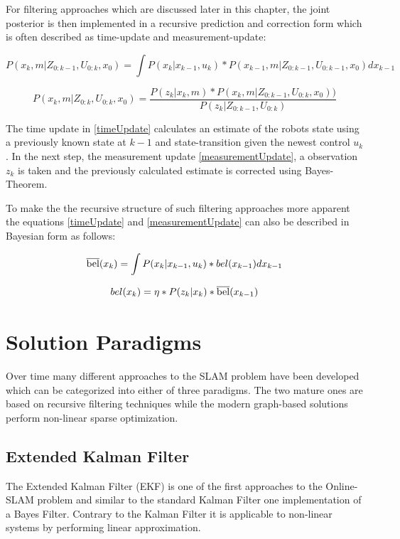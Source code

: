 For filtering approaches which are discussed later in this chapter, the joint posterior is then implemented in a recursive prediction and correction form which is often described as time-update and measurement-update:

\begin{equation}\label{timeUpdate}
	P(x_{k}, m | Z_{0:k-1}, U_{0:k}, x_{0}) = \int P(x_{k} | x_{k-1}, u_{k}) * P(x_{k-1}, m | Z_{0:k-1}, U_{0:k-1}, x_{0}) dx_{k-1}
\end{equation}


\begin{equation}\label{measurementUpdate}
	P(x_{k}, m | Z_{0:k}, U_{0:k}, x_{0}) = \frac{P(z_{k} | x_{k}, m) * P(x_{k}, m | Z_{0:k-1}, U_{0:k}, x_{0}))}{P(z_{k} | Z_{0:k-1}, U_{0:k})}
\end{equation}

The time update in \ref{timeUpdate} calculates an estimate of the robots state using a previously known state at $ k - 1 $ and state-transition given the newest control $ u_{k} $.
In the next step, the measurement update \ref{measurementUpdate}, a observation $z_{k} $ is taken and the previously calculated estimate is corrected using Bayes-Theorem. 

To make the the recursive structure of such filtering approaches more apparent the equations \ref{timeUpdate} and \ref{measurementUpdate} can also be described in Bayesian form as follows:

\begin{equation}\label{timeUpdateBayes}
	\overline{\rm bel}(x_{k}) = \int P(x_{k} | x_{k-1}, u_{k}) * bel(x_{k-1}) dx_{k-1}
\end{equation}


\begin{equation}\label{measurementUpdateBayes}
	bel(x_{k}) = \eta * P(z_{k} | x_{k}) * \overline{\rm bel}(x_{k-1})
\end{equation}

\section{Solution Paradigms} 
Over time many different approaches to the SLAM problem have been developed which can be categorized into either of three paradigms. The two mature ones are based on recursive filtering techniques while the modern graph-based solutions perform non-linear sparse optimization.

\subsection{Extended Kalman Filter}
The Extended Kalman Filter (EKF) is one of the first approaches to the Online-SLAM problem and similar to the standard Kalman Filter one implementation of a Bayes Filter. Contrary to the Kalman Filter it is applicable to non-linear systems by performing linear approximation.

